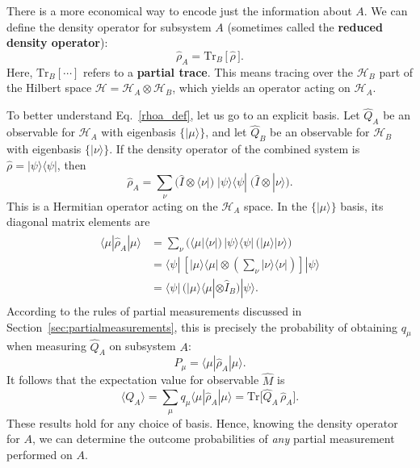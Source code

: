 \documentclass[pra,12pt]{revtex4-2}
\begin{document}
There is a more economical way to encode just the information about
$A$.  We can define the density operator for subsystem $A$ (sometimes
called the \textbf{reduced density operator}):
\begin{equation}
  \hat{\rho}_A = \mathrm{Tr}_B \,\big[\,\hat{\rho}\,\big].
  \label{rhoa_def}
\end{equation}
Here, $\mathrm{Tr}_B[\cdots]$ refers to a \textbf{partial trace}.
This means tracing over the $\mathscr{H}_B$ part of the Hilbert space
$\mathscr{H} = \mathscr{H}_A \otimes \mathscr{H}_B$, which yields an
operator acting on $\mathscr{H}_A$.

To better understand Eq.~\eqref{rhoa_def}, let us go to an explicit
basis.  Let $\hat{Q}_A$ be an observable for $\mathscr{H}_A$ with
eigenbasis $\{|\mu\rangle\}$, and let $\hat{Q}_B$ be an observable for
$\mathscr{H}_B$ with eigenbasis $\{|\nu\rangle\}$.  If the density
operator of the combined system is $\hat{\rho} = |\psi\rangle\langle
\psi|$, then
\begin{equation}
  \hat{\rho}_A =
    \sum_\nu
    \Big( \hat{I}\otimes \langle \nu| \Big)
    \; |\psi\rangle \langle \psi | \;
    \Big( \hat{I}\otimes | \nu\rangle \Big).
    \label{rhoa_explicit}
\end{equation}
This is a Hermitian operator acting on the $\mathscr{H}_A$ space.  In
the $\{|\mu\rangle\}$ basis, its diagonal matrix elements are
\begin{align}
  \begin{aligned}
    \langle \mu | \hat{\rho}_A | \mu \rangle
    &=
    \sum_\nu
    \Big( \langle \mu| \langle \nu| \Big)
    \, |\psi\rangle \langle \psi | \,
    \Big( |\mu\rangle | \nu\rangle \Big) \\
    &=
    \langle \psi | \,
    \left[ |\mu\rangle \langle \mu| \otimes
      \left(\sum_\nu | \nu\rangle \langle \nu|\right) \right]
    |\psi\rangle \\
    &=
    \langle \psi | \,
    \Big( |\mu\rangle \langle \mu| \otimes \hat{I}_B\Big) |\psi\rangle.
  \end{aligned}
\end{align}
According to the rules of partial measurements discussed in
Section~\ref{sec:partialmeasurements}, this is precisely the
probability of obtaining $q_\mu$ when measuring $\hat{Q}_A$ on subsystem
$A$:
\begin{equation}
  P_\mu = \langle \mu | \hat{\rho}_A | \mu \rangle.
  \label{rho_prob}
\end{equation}
It follows that the expectation value for observable $\hat{M}$ is
\begin{equation}
  \langle Q_A \rangle = \sum_\mu q_\mu
  \langle \mu | \hat{\rho}_A | \mu \rangle
  = \mathrm{Tr}\Big[\hat{Q}_A \, \hat{\rho}_A \Big].
  \label{rho_expect}
\end{equation}
These results hold for any choice of basis.  Hence, knowing the
density operator for $A$, we can determine the outcome probabilities
of \textit{any} partial measurement performed on $A$.
\end{document}
